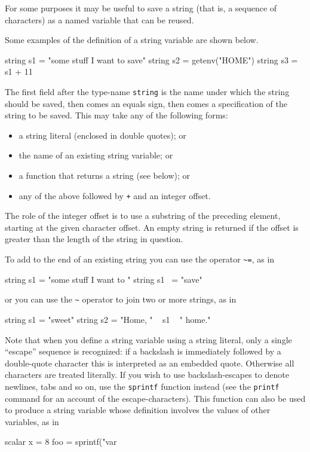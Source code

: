 For some purposes it may be useful to save a string (that is, a
sequence of characters) as a named variable that can be reused.

Some examples of the definition of a string variable are shown
below.
%
\begin{code}
string s1 = "some stuff I want to save"
string s2 = getenv("HOME")
string s3 = s1 + 11
\end{code}
%
The first field after the type-name \texttt{string} is the name under
which the string should be saved, then comes an equals sign, then
comes a specification of the string to be saved. This may take any of
the following forms:

\begin{itemize}
\item a string literal (enclosed in double quotes); or
\item the name of an existing string variable; or
\item a function that returns a string (see below); or
\item any of the above followed by \texttt{+} and an integer offset.
\end{itemize}

The role of the integer offset is to use a substring of the preceding
element, starting at the given character offset.  An empty string is
returned if the offset is greater than the length of the string in
question.

To add to the end of an existing string you can use the operator
\verb|~=|, as in
%
\begin{code}
string s1 = "some stuff I want to "
string s1 ~= "save"
\end{code}
or you can use the \verb|~| operator to join two or more strings, as
in
\begin{code}
string s1 = "sweet"
string s2 = "Home, " ~ s1 ~ " home."
\end{code}

Note that when you define a string variable using a string literal,
only a single ``escape'' sequence is recognized: if a backslash is
immediately followed by a double-quote character this is interpreted
as an embedded quote. Otherwise all characters are treated literally.
If you wish to use backslash-escapes to denote newlines, tabs and so
on, use the \texttt{sprintf} function instead (see the \texttt{printf}
command for an account of the escape-characters). This function can
also be used to produce a string variable whose definition involves
the values of other variables, as in
%
\begin{code}
scalar x = 8
foo = sprintf("var%
\end{code}

